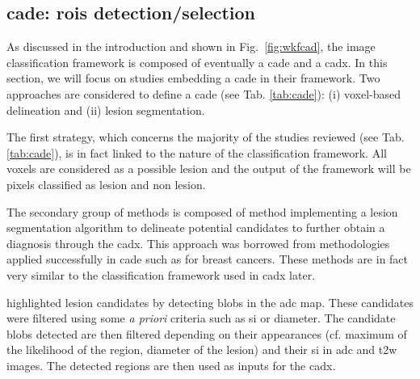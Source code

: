 \subsection{\ac{cade}: \acp{roi} detection/selection}\label{cade}

As discussed in the introduction and shown in Fig.~\ref{fig:wkfcad}, the image classification framework is composed of eventually a \ac{cade} and a \ac{cadx}. In this section, we will focus on studies embedding a \ac{cade} in their framework. Two approaches are considered to define a \ac{cade} (see Tab. \ref{tab:cade}): (i) voxel-based delineation and (ii) lesion segmentation.

The first strategy, which concerns the majority of the studies reviewed (see Tab. \ref{tab:cade}), is in fact linked to the nature of the classification framework. All voxels are considered as a possible lesion and the output of the framework will be pixels classified as lesion and non lesion.

The secondary group of methods is composed of method implementing a lesion segmentation algorithm to delineate potential candidates to further obtain a diagnosis through the \ac{cadx}. This approach was borrowed from methodologies applied successfully in \ac{cade} such as for breast cancers. These methods are in fact very similar to the classification framework used in \ac{cadx} later.

\cite{Vos2012} highlighted lesion candidates by detecting blobs in the \ac{adc} map. These candidates were filtered using some \textit{a priori} criteria such as \ac{si} or diameter. %
%
%
%
The candidate blobs detected are then filtered depending on their appearances (cf. maximum of the likelihood of the region, diameter of the lesion) and their \ac{si} in \ac{adc} and \ac{t2w} images. The detected regions are then used as inputs for the \ac{cadx}.

